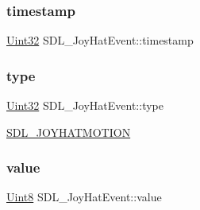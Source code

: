 \subsubsection{\texorpdfstring{timestamp}{timestamp}}
{\footnotesize\ttfamily \hyperlink{_s_d_l__stdinc_8h_add440eff171ea5f55cb00c4a9ab8672d}{Uint32} S\+D\+L\+\_\+\+Joy\+Hat\+Event\+::timestamp}

\mbox{\label{struct_s_d_l___joy_hat_event_ac583dafab46c44354e210a542aff57cc}} 
\subsubsection{\texorpdfstring{type}{type}}
{\footnotesize\ttfamily \hyperlink{_s_d_l__stdinc_8h_add440eff171ea5f55cb00c4a9ab8672d}{Uint32} S\+D\+L\+\_\+\+Joy\+Hat\+Event\+::type}

\hyperlink{_s_d_l__events_8h_a3b589e89be6b35c02e0dd34a55f3fccaafba4080bfbad335e520097b2024f0dff}{S\+D\+L\+\_\+\+J\+O\+Y\+H\+A\+T\+M\+O\+T\+I\+ON} \mbox{\label{struct_s_d_l___joy_hat_event_a52b179a34407449941b61d988ca72ef4}} 
\subsubsection{\texorpdfstring{value}{value}}
{\footnotesize\ttfamily \hyperlink{_s_d_l__stdinc_8h_a2944638813a090aa23e62f4da842c3e2}{Uint8} S\+D\+L\+\_\+\+Joy\+Hat\+Event\+::value}

